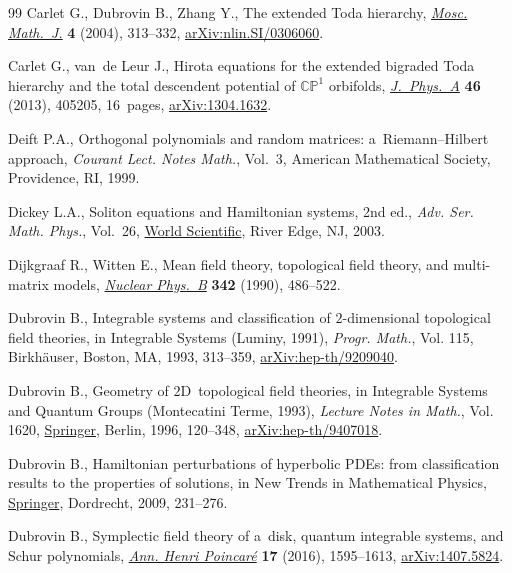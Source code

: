 \documentclass[pdftex]{sigma}
\numberwithin{equation}{section}
\begin{document}
\begin{thebibliography}{99}
Carlet G., Dubrovin B., Zhang Y., The extended {T}oda hierarchy,
 \href{https://doi.org/10.17323/1609-4514-2004-4-2-313-332}{\textit{Mosc.
 Math.~J.}} \textbf{4} (2004), 313--332,
 \href{http://arxiv.org/abs/nlin.SI/0306060}{arXiv:nlin.SI/0306060}.

Carlet G., van~de Leur J., Hirota equations for the extended bigraded {T}oda
 hierarchy and the total descendent potential of {$\mathbb{CP}^1$} orbifolds,
 \href{https://doi.org/10.1088/1751-8113/46/40/405205}{\textit{J.~Phys.~A}}
 \textbf{46} (2013), 405205, 16~pages,
 \href{http://arxiv.org/abs/1304.1632}{arXiv:1304.1632}.

Deift P.A., Orthogonal polynomials and random matrices: a~{R}iemann--{H}ilbert
 approach, \textit{Courant Lect. Notes Math.}, Vol.~3, American Mathematical
 Society, Providence, RI, 1999.

Dickey L.A., Soliton equations and {H}amiltonian systems, 2nd ed., \textit{Adv. Ser.
 Math. Phys.}, Vol.~26, \href{https://doi.org/10.1142/5108}{World
 Scientific}, River Edge, NJ, 2003.

Dijkgraaf R., Witten E., Mean field theory, topological field theory, and
 multi-matrix models,
 \href{https://doi.org/10.1016/0550-3213(90)90324-7}{\textit{Nuclear Phys.~B}}
 \textbf{342} (1990), 486--522.

Dubrovin B., Integrable systems and classification of {$2$}-dimensional
 topological field theories, in Integrable Systems ({L}uminy, 1991),
 \textit{Progr. Math.}, Vol. 115, Birkh\"auser, Boston, MA, 1993, 313--359,
 \href{http://arxiv.org/abs/hep-th/9209040}{arXiv:hep-th/9209040}.

Dubrovin B., Geometry of {$2$}{D}~topological field theories, in Integrable
 Systems and Quantum Groups ({M}ontecatini {T}erme, 1993), \textit{Lecture
 Notes in Math.}, Vol. 1620,
 \href{https://doi.org/10.1007/BFb0094793}{Springer}, Berlin, 1996, 120--348,
 \href{http://arxiv.org/abs/hep-th/9407018}{arXiv:hep-th/9407018}.

Dubrovin B., Hamiltonian perturbations of hyperbolic {PDE}s: from
 classification results to the properties of solutions, in New Trends in
 Mathematical Physics,
 \href{https://doi.org/10.1007/978-90-481-2810-5_18}{Springer}, Dordrecht,
 2009, 231--276.

Dubrovin B., Symplectic field theory of a~disk, quantum integrable systems, and
 {S}chur polynomials,
 \href{https://doi.org/10.1007/s00023-015-0449-2}{\textit{Ann. Henri
 Poincar\'e}} \textbf{17} (2016), 1595--1613,
 \href{http://arxiv.org/abs/1407.5824}{arXiv:1407.5824}.


\end{thebibliography}
\end{document}

